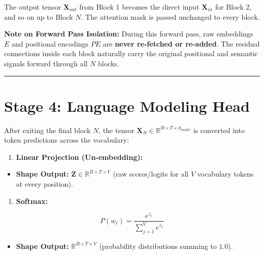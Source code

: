 \documentclass[11pt,a4paper,oneside]{report}
\providecommand{\tightlist}{\setlength{\itemsep}{0pt}\setlength{\parskip}{0pt}}
\begin{document}
The output tensor \(\mathbf{X}_{out}\) from Block 1 becomes the direct input \(\mathbf{X}_{in}\) for Block 2, and so on up to Block \(N\). The attention mask is passed unchanged to every block.

\textbf{Note on Forward Pass Isolation:} During this forward pass, raw embeddings \(E\) and positional encodings \(PE\) are \textbf{never re-fetched or re-added}. The residual connections inside each block naturally carry the original positional and semantic signals forward through all \(N\) blocks.

\begin{center}\rule{0.5\linewidth}{0.5pt}\end{center}

\section{Stage 4: Language Modeling Head}\label{stage-4-language-modeling-head}

After exiting the final block \(N\), the tensor \(\mathbf{X}_N \in \mathbb{R}^{B \times T \times d_{model}}\) is converted into token predictions across the vocabulary:

\begin{enumerate}
\def\labelenumi{\arabic{enumi}.}
\tightlist
\item
  \textbf{Linear Projection (Un-embedding):}
\end{enumerate}

\begin{center}\end{center}

\begin{itemize}
\tightlist
\item
  \textbf{Shape Output:} \(\mathbf{Z} \in \mathbb{R}^{B \times T \times V}\) (raw scores/logits for all \(V\) vocabulary tokens at every position).
\end{itemize}

\begin{enumerate}
\def\labelenumi{\arabic{enumi}.}
\setcounter{enumi}{1}
\tightlist
\item
  \textbf{Softmax:}
\end{enumerate}

\[P(w_i) = \frac{e^{z_i}}{\sum_{j=1}^{V} e^{z_j}}\]

\begin{itemize}
\tightlist
\item
  \textbf{Shape Output:} \(\mathbb{R}^{B \times T \times V}\) (probability distributions summing to \(1.0\)).
\end{itemize}
\end{document}
